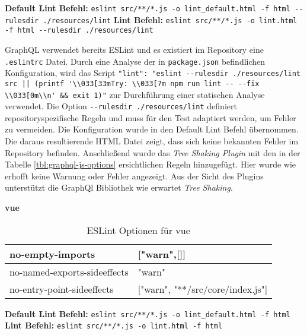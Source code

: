 \begin{center}
\textbf{Default Lint Befehl:} \lstinline{eslint src/**/*.js -o lint_default.html -f html --rulesdir ./resources/lint}\linebreak 
\textbf{Lint Befehl:} \lstinline{eslint src/**/*.js -o lint.html -f html --rulesdir ./resources/lint}
\end{center}

GraphQL verwendet bereits ESLint und es existiert im Repository eine \lstinline{.eslintrc} Datei. Durch eine Analyse der in \lstinline{package.json} befindlichen Konfiguration, wird das Script \lstinline{"lint": "eslint --rulesdir ./resources/lint src || (printf '\\033[33mTry: \\033[7m npm run lint -- --fix \\033[0m\\n' && exit 1)"} zur Durchführung einer statischen Analyse verwendet. Die Option \lstinline{--rulesdir ./resources/lint} definiert repositoryspezifische Regeln und muss für den Test adaptiert werden, um Fehler zu vermeiden. Die Konfiguration wurde in den Default Lint Befehl übernommen. Die daraus resultierende HTML Datei zeigt, dass sich keine bekannten Fehler im Repository befinden. Anschließend wurde das \textit{Tree Shaking Plugin} mit den in der Tabelle \ref{tbl:graphql-js-options} ersichtlichen Regeln hinzugefügt. Hier wurde wie erhofft keine Warnung oder Fehler angezeigt. Aus der Sicht des Plugins unterstützt die GraphQl Bibliothek wie erwartet \textit{Tree Shaking}.

\textbf{vue}
\begin{table}[H]
\centering
\caption{ESLint Optionen für vue}
\label{tbl:vue-options}
\begin{tabular}{|l|l|}
\hline
no-empty-imports             & {[}"warn",{[}{]}{]}         \\ \hline
no-named-exports-sideeffects & "warn"                      \\ \hline
no-entry-point-sideeffects   & {[}"warn", "**/src/core/index.js"{]} \\ \hline
\end{tabular}
\end{table}

\begin{center}
\textbf{Default Lint Befehl:} \lstinline{eslint src/**/*.js -o lint_default.html -f html}\linebreak 
\textbf{Lint Befehl:} \lstinline{eslint src/**/*.js -o lint.html -f html}
\end{center}


